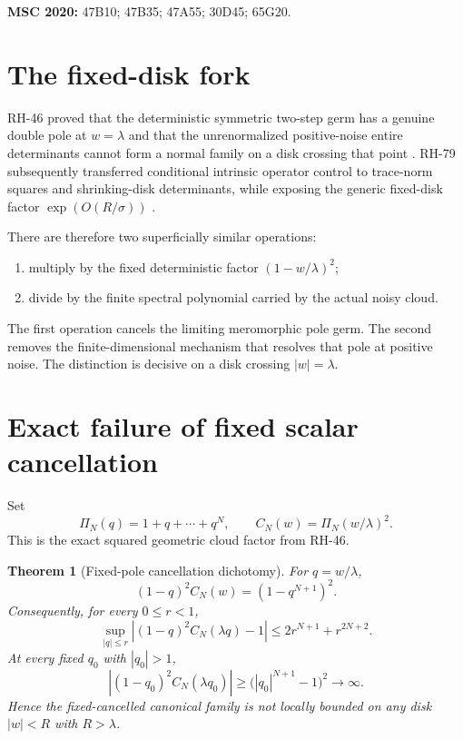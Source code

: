 \documentclass[11pt]{article}
\newtheorem{theorem}{Theorem}[section]
\theoremstyle{remark}
\begin{document}
\medskip
\noindent\textbf{MSC 2020:} 47B10; 47B35; 47A55; 30D45; 65G20.

\section{The fixed-disk fork}

RH-46 proved that the deterministic symmetric two-step germ has a genuine
double pole at $w=\lambda$ and that the unrenormalized positive-noise entire
determinants cannot form a normal family on a disk crossing that point
\citep{WangDoublePole2026}.  RH-79 subsequently transferred conditional
intrinsic operator control to trace-norm squares and shrinking-disk
determinants, while exposing the generic fixed-disk factor
$\exp(O(R/\sigma))$ \citep{WangDiagonalTransfer2026}.

There are therefore two superficially similar operations:
\begin{enumerate}[leftmargin=2em]
 \item multiply by the fixed deterministic factor $(1-w/\lambda)^2$;
 \item divide by the finite spectral polynomial carried by the actual noisy
 cloud.
\end{enumerate}
The first operation cancels the limiting meromorphic pole germ.  The second
removes the finite-dimensional mechanism that resolves that pole at positive
noise.  The distinction is decisive on a disk crossing $|w|=\lambda$.

\section{Exact failure of fixed scalar cancellation}

Set
\[
 \Pi_N(q)=1+q+\cdots+q^N,
 \qquad C_N(w)=\Pi_N(w/\lambda)^2.
\]
This is the exact squared geometric cloud factor from RH-46.

\begin{theorem}[Fixed-pole cancellation dichotomy]
\label{thm:fixed-failure}
For $q=w/\lambda$,
\begin{equation}
 (1-q)^2C_N(w)=(1-q^{N+1})^2.
 \label{eq:exact-cancellation}
\end{equation}
Consequently, for every $0\le r<1$,
\begin{equation}
 \sup_{|q|\le r}
 \left|(1-q)^2C_N(\lambda q)-1\right|
 \le 2r^{N+1}+r^{2N+2}.
 \label{eq:interior-bound}
\end{equation}
At every fixed $q_0$ with $|q_0|>1$,
\begin{equation}
 \left|(1-q_0)^2C_N(\lambda q_0)\right|
 \ge \bigl(|q_0|^{N+1}-1\bigr)^2\longrightarrow\infty.
 \label{eq:exterior-growth}
\end{equation}
Hence the fixed-cancelled canonical family is not locally bounded on any disk
$|w|<R$ with $R>\lambda$.
\end{theorem}
\end{document}
